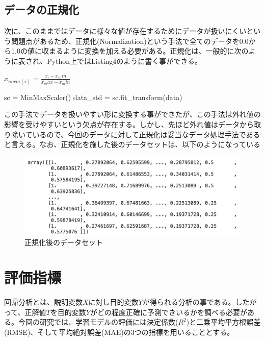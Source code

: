 \documentclass{report}
\begin{document}
\subsection{データの正規化}

次に、このままではデータに様々な値が存在するためにデータが扱いにくいという問題点があるため、正規化(Normalization)という手法で全てのデータを0.0から1.0の値に収まるように変換を加える必要がある。正規化は、一般的に次のように表され、Python上ではListing4のように書く事ができる。

\begin{center}
\begin{math}
x_{norm(i)} = \frac{x_i - x_min }{ x_max - x_min } 
\end{math}
\end{center}


\begin{python}[caption=データの正規化]
sc = MinMaxScaler()
data_std = sc.fit_transform(data)
\end{python}

この手法でデータを扱いやすい形に変換する事ができたが、この手法は外れ値の影響を受けやすいという欠点が存在する。しかし、先ほど外れ値はデータから取り除いているので、今回のデータに対して正規化は妥当なデータ処理手法であると言える。なお、正規化を施した後のデータセットは、以下のようになっている

\begin{figure}[H]
\begin{center}
\includegraphics[width=\linewidth]{data_normalized.png}
\caption{正規化後のデータセット}
\end{center}
\end{figure}

\newpage
\section{評価指標}

回帰分析とは、説明変数\begin{math}X\end{math}に対し目的変数\begin{math}Y\end{math}が得られる分析の事である。したがって、正解値\begin{math}T\end{math}を目的変数\begin{math}Y\end{math}がどの程度正確に予測できいるかを調べる必要がある。今回の研究では、学習モデルの評価には決定係数(\begin{math}R^2\end{math})と二乗平均平方根誤差(RMSE)、そして平均絶対誤差(MAE)の3つの指標を用いることとする。
\end{document}
